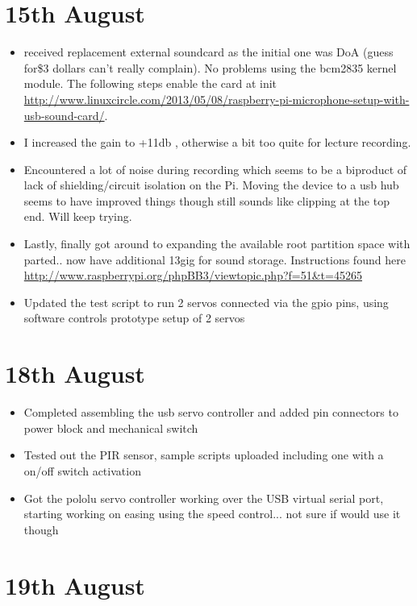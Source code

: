 \section*{15th August}

\begin{itemize}
  \item received replacement external soundcard as the initial one was DoA (guess for\$3 dollars can't really complain). No problems using the bcm2835 kernel module. The following steps enable the card at init \url{http://www.linuxcircle.com/2013/05/08/raspberry-pi-microphone-setup-with-usb-sound-card/}.
  \item I increased the gain to +11db , otherwise a bit too quite for lecture recording.
  \item Encountered a lot of noise during recording which seems to be a biproduct of lack of shielding/circuit isolation on the Pi. Moving the device to a usb hub seems to have improved things though still sounds like clipping at the top end. Will keep trying.
  \item Lastly, finally got around to expanding the available root partition space with parted.. now have additional 13gig for sound storage. Instructions found here \url{http://www.raspberrypi.org/phpBB3/viewtopic.php?f=51&t=45265}
  \item Updated the test script to run 2 servos connected via the gpio pins, using software controls
prototype setup of 2 servos
\end{itemize}



\section*{18th August}

\begin{itemize}
  \item Completed assembling the usb servo controller and added pin connectors to power block and mechanical switch
  \item Tested out the PIR sensor, sample scripts uploaded including one with a on/off switch activation
  \item Got the pololu servo controller working over the USB virtual serial port, starting working on easing using the speed control... not sure if would use it though
\end{itemize}



\section*{19th August}

